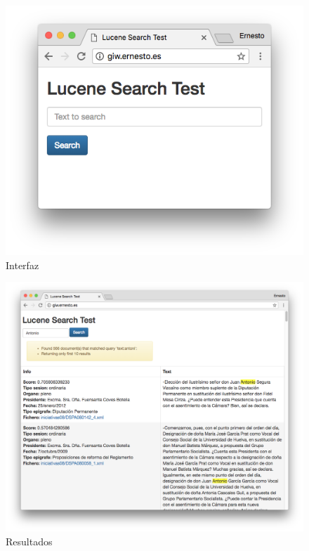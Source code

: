 \begin{figure}
\centering
\includegraphics[width=1.0\textwidth]{../images/interface1.png}
\caption{Interfaz}
\end{figure}

\begin{figure}
\centering
\includegraphics[width=1.1\textwidth]{../images/results1.png}
\caption{Resultados}
\end{figure}








